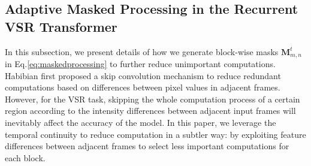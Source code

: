 \documentclass[10pt,twocolumn,letterpaper]{article}
\begin{document}
\subsection{Adaptive Masked Processing in the Recurrent VSR Transformer}
\label{sec:mask}
In this subsection, we present details of how we generate block-wise masks $\bm{M}_{m,n}^{t}$ in Eq.\ref{eq:maskedprocessing} to further reduce unimportant computations.
%
%
Habibian \etal\cite{habibian2021skip} first proposed a skip convolution mechanism to reduce redundant computations based on differences between pixel values in adjacent frames.
%
However, for the VSR task, skipping the whole computation process of a certain region according to the intensity differences between adjacent input frames will
inevitably affect the accuracy of the model. 
%
In this paper, we leverage the temporal continuity to reduce computation
in a subtler way: by exploiting feature differences between adjacent frames to select less important computations for each block.
%
\end{document}
